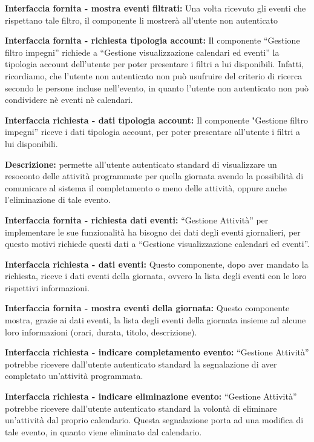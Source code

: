 \begin{listaPersonale}[DCI]{}
    \textbf{Interfaccia fornita - mostra eventi filtrati:} Una volta ricevuto gli eventi che rispettano tale filtro, il componente li mostrerà all'utente non autenticato

    \textbf{Interfaccia fornita - richiesta tipologia account:} Il componente “Gestione filtro impegni” richiede a “Gestione visualizzazione calendari ed eventi”  la tipologia account dell'utente per poter presentare i filtri a lui disponibili. Infatti, ricordiamo, che l'utente non autenticato non può usufruire del criterio di ricerca secondo le persone incluse nell'evento, in quanto l'utente non autenticato non può condividere nè eventi nè calendari.

    \textbf{Interfaccia richiesta - dati tipologia account:} Il componente "Gestione filtro impegni” riceve i dati tipologia account, per poter presentare all'utente i filtri a lui disponibili.



    \textbf{Descrizione:} permette all'utente autenticato standard di visualizzare un resoconto delle attività programmate per quella giornata avendo la possibilità di comunicare al sistema il completamento o meno delle attività, oppure anche l'eliminazione di tale evento.

    \textbf{Interfaccia fornita - richiesta dati eventi:} “Gestione Attività” per implementare le sue funzionalità ha bisogno dei dati degli eventi giornalieri, per questo motivi richiede questi dati a “Gestione visualizzazione calendari ed eventi”.

    \textbf{Interfaccia richiesta - dati eventi:} Questo componente, dopo aver mandato la richiesta, riceve i dati eventi della giornata, ovvero la lista degli eventi con le loro rispettivi informazioni.

    \textbf{Interfaccia fornita - mostra eventi della giornata:} Questo componente mostra, grazie ai dati eventi, la lista degli eventi della giornata insieme ad alcune loro informazioni (orari, durata, titolo, descrizione).

    \textbf{Interfaccia richiesta - indicare completamento evento:} “Gestione Attività” potrebbe ricevere dall'utente autenticato standard la segnalazione di aver completato un'attività programmata.

    \textbf{Interfaccia richiesta - indicare eliminazione evento:} “Gestione Attività” potrebbe ricevere dall'utente autenticato standard la volontà di eliminare un'attività dal proprio calendario. Questa segnalazione porta ad una modifica di tale evento, in quanto viene eliminato dal calendario.


\end{listaPersonale}
